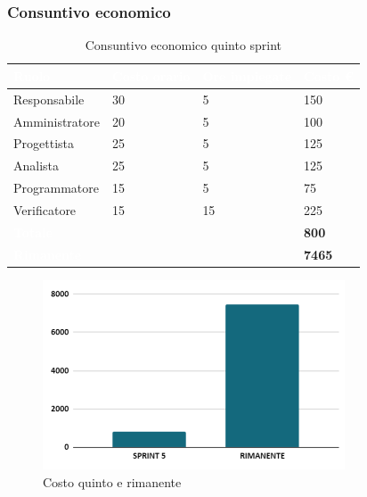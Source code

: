 \newpage
\subsubsection{Consuntivo economico}
{
\setlength{\tabcolsep}{10pt}
\renewcommand{\arraystretch}{1.5}
\begin{table}[h]
    \centering
    \begin{tabularx}{\textwidth}{| l | l | l | X |}
        \hline
        \rowcolor{headerrow} \textbf{\textcolor{white}{Ruolo}} & \textbf{\textcolor{white}{Costo orario}} & \textbf{\textcolor{white}{Ore impiegate}} & \textbf{\textcolor{white}{Costo €}} \\
        \hline
        Responsabile & 30 & 5 & 150\\
        \hline
        Amministratore & 20 & 5 & 100\\
        \hline
        Progettista & 25 & 5 & 125\\
        \hline
        Analista & 25 & 5 & 125\\
        \hline
        Programmatore & 15 & 5 & 75\\
        \hline
        Verificatore & 15 & 15 & 225\\
        \hline
        \cellcolor{headerrow} \textbf{\textcolor{white}{Totale}} &  &  & \textbf{800}\\
        \hline
        \cellcolor{headerrow} \textbf{\textcolor{white}{Rimanente}} &  &  & \textbf{7465}\\
        \hline
    \end{tabularx}
    \caption{Consuntivo economico quinto sprint}
    \label{tab:consuntivocostiquintosprint}
\end{table}
}

\begin{figure}[h!]
    \centering
    \includegraphics[width=0.8\textwidth]{cons5costo.png}
    \caption{Costo quinto e rimanente}
    \label{fig:consuntivocostoquintopsprint}
\end{figure}

